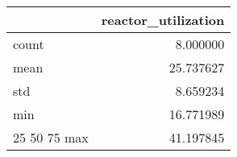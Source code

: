 \begin{tabular}{lr}
\toprule
 & reactor\_utilization \\
\midrule
count & 8.000000 \\
mean & 25.737627 \\
std & 8.659234 \\
min & 16.771989 \\
25%
50%
75%
max & 41.197845 \\
\bottomrule
\end{tabular}

